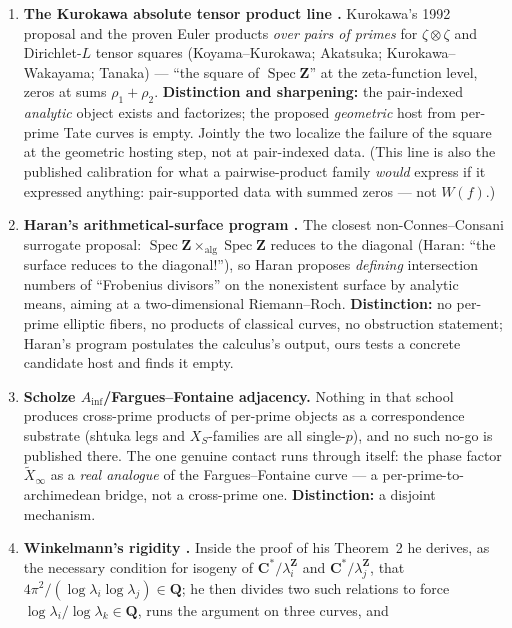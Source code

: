 \documentclass[11pt]{article}
\theoremstyle{definition}
\theoremstyle{remark}
\newcommand{\Z}{\mathbf{Z}}
\newcommand{\Q}{\mathbf{Q}}
\newcommand{\C}{\mathbf{C}}
\newcommand{\SpecZ}{\operatorname{Spec}\Z}
\begin{document}
\begin{enumerate}
geometric data. Opposite poles: abstract axioms with RH-equivalent
existence versus concrete surfaces with provably empty calculus.
\item \textbf{The Kurokawa absolute tensor product line
\cite{Ku92, Ak09, Ta20}.} Kurokawa's 1992 proposal and the proven Euler
products \emph{over pairs of primes} for $\zeta \otimes \zeta$ and
Dirichlet-$L$ tensor squares (Koyama--Kurokawa; Akatsuka;
Kurokawa--Wakayama; Tanaka) --- ``the square of $\SpecZ$'' at the
zeta-function level, zeros at sums $\rho_1 + \rho_2$. \textbf{Distinction
and sharpening:} the pair-indexed \emph{analytic} object exists and
factorizes; the proposed \emph{geometric} host from per-prime Tate curves is
empty. Jointly the two localize the failure of the square at the geometric
hosting step, not at pair-indexed data. (This line is also the published
calibration for what a pairwise-product family \emph{would} express if it
expressed anything: pair-supported data with summed zeros --- not $W(f)$.)
\item \textbf{Haran's arithmetical-surface program \cite{Ha91}.} The closest
non-Connes--Consani surrogate proposal:
$\SpecZ \times_{\mathrm{alg}} \SpecZ$ reduces to the diagonal (Haran: ``the
surface reduces to the diagonal!''), so Haran proposes \emph{defining}
intersection numbers of ``Frobenius divisors'' on the nonexistent surface by
analytic means, aiming at a two-dimensional Riemann--Roch.
\textbf{Distinction:} no per-prime elliptic fibers, no products of classical
curves, no obstruction statement; Haran's program postulates the calculus's
output, ours tests a concrete candidate host and finds it empty.
\item \textbf{Scholze $A_{\mathrm{inf}}$/Fargues--Fontaine adjacency.}
Nothing in that school produces cross-prime products of per-prime objects as
a correspondence substrate (shtuka legs and $X_S$-families are all
single-$p$), and no such no-go is published there. The one genuine contact
runs through \cite{CC26} itself: the phase factor $\widetilde{X}_\infty$ as
a \emph{real analogue} of the Fargues--Fontaine curve --- a
per-prime-to-archimedean bridge, not a cross-prime one.
\textbf{Distinction:} a disjoint mechanism.
\item \textbf{Winkelmann's rigidity \cite{Wi04}.} Inside the proof of his
Theorem~2 he derives, as the necessary condition for isogeny of
$\C^*/\lambda_i^{\Z}$ and $\C^*/\lambda_j^{\Z}$, that
$4\pi^2/(\log\lambda_i\log\lambda_j) \in \Q$; he then divides two such
relations to force
$\log\lambda_i/\log\lambda_k \in \Q$, runs the argument on three curves, and

\end{enumerate}
\end{document}
